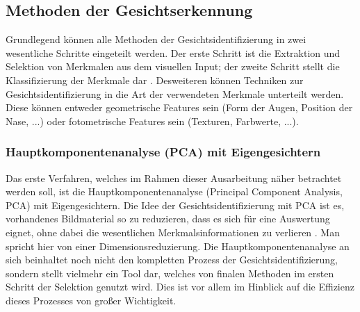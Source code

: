 \documentclass[doktyp=semarbeit, sprache=german]{TUBAFarbeiten}
\begin{document}
\subsection{Methoden der Gesichtserkennung}
Grundlegend können alle Methoden der Gesichtsidentifizierung in zwei wesentliche Schritte eingeteilt werden. Der erste Schritt ist die Extraktion und Selektion von Merkmalen aus dem visuellen Input; der zweite Schritt stellt die Klassifizierung der Merkmale dar \cite{FRS}. Desweiteren können Techniken zur Gesichtsidentifizierung in die Art der verwendeten Merkmale unterteilt werden. Diese können entweder geometrische Features sein (Form der Augen, Position der Nase, ...) oder fotometrische Features sein (Texturen, Farbwerte, ...).
\subsubsection{Hauptkomponentenanalyse (PCA) mit Eigengesichtern}
Das erste Verfahren, welches im Rahmen dieser Ausarbeitung näher betrachtet werden soll, ist die Hauptkomponentenanalyse (Principal Component Analysis, PCA) mit Eigengesichtern. Die Idee der Gesichtsidentifizierung mit PCA ist es, vorhandenes Bildmaterial so zu reduzieren, dass es sich für eine Auswertung eignet, ohne dabei die wesentlichen Merkmalsinformationen zu verlieren \cite{PCANova}. Man spricht hier von einer Dimensionsreduzierung. Die Hauptkomponentenanalyse an sich beinhaltet noch nicht den kompletten Prozess der Gesichtsidentifizierung, sondern stellt vielmehr ein Tool dar, welches von finalen Methoden im ersten Schritt der Selektion genutzt wird. Dies ist vor allem im Hinblick auf die Effizienz dieses Prozesses von großer Wichtigkeit.
\end{document}
